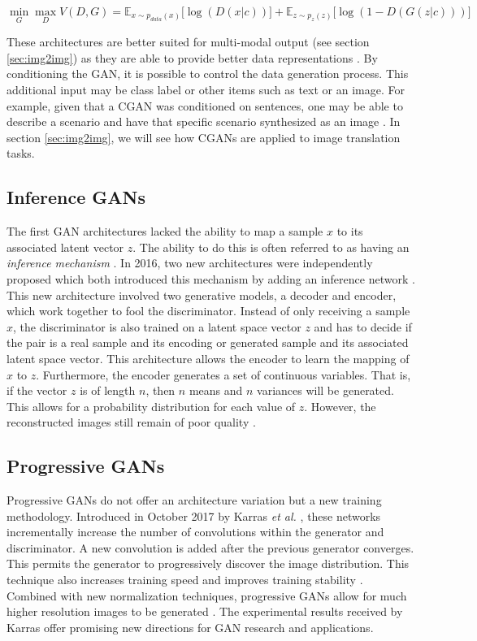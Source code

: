\documentclass[11pt]{article}
\begin{document}
$$\min_{G}\max_{D}V(D, G) = \mathbb{E}_{x\sim p_{data}(x)}\Big[\log(D(x|c))\Big] + \mathbb{E}_{z\sim p_z(z)}\Big[\log(1-D(G(z|c)))\Big]$$

These architectures are better suited for multi-modal output (see section \ref{sec:img2img}) as they are able to provide better data representations \citep{2017arXiv171007035C}. By conditioning the GAN, it is possible to control the data generation process. This additional input may be class label or other items such as text or an image. For example, given that a CGAN was conditioned on sentences, one may be able to describe a scenario and have that specific scenario synthesized as an image \citep{2016arXiv160505396R}. In section \ref{sec:img2img}, we will see how CGANs are applied to image translation tasks.

\subsection{Inference GANs} \label{sec:inferencegan}
The first GAN architectures lacked the ability to map a sample $x$ to its associated latent vector $z$. The ability to do this is often referred to as having an \textit{inference mechanism} \citep{2017arXiv171007035C}. In 2016, two new architectures were independently proposed which both introduced this mechanism by adding an inference network \citep{2016arXiv160509782D, 2016arXiv160600704D}. This new architecture involved two generative models, a decoder and encoder, which work together to fool the discriminator. Instead of only receiving a sample $x$, the discriminator is also trained on a latent space vector $z$ and has to decide if the pair is a real sample and its encoding or generated sample and its associated latent space vector. This architecture allows the encoder to learn the mapping of $x$ to $z$. Furthermore, the encoder generates a set of continuous variables. That is, if the vector $z$ is of length $n$, then $n$ means and $n$ variances will be generated. This allows for a probability distribution for each value of $z$. However, the reconstructed images still remain of poor quality \citep{2017arXiv171007035C}.

\subsection{Progressive GANs} \label{sec:proggans}
Progressive GANs do not offer an architecture variation but a new training methodology. Introduced in October 2017 by Karras \textit{et al.} \citep{2017arXiv171010196K}, these networks incrementally increase the number of convolutions within the generator and discriminator. A new convolution is added after the previous generator converges. This permits the generator to progressively discover the image distribution. This technique also increases training speed and improves training stability \citep{2017arXiv171010196K}. Combined with new normalization techniques, progressive GANs allow for much higher resolution images to be generated \citep{2017arXiv171010196K}. The experimental results received by Karras offer promising new directions for GAN research and applications.
\end{document}
